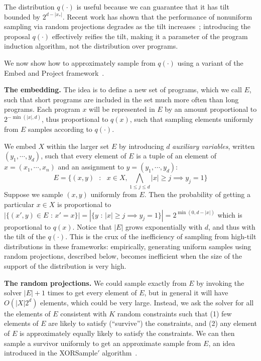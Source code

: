 \documentclass{article}
\begin{document}
The distribution $q(\cdot )$ is useful because we can guarantee that it has tilt bounded by
$2^{d - \lvert x_* \rvert }$.
Recent work has shown that the performance of nonuniform sampling via random projections degrades as the tilt increases~\cite{chakraborty2014distribution};
introducing the proposal $q(\cdot )$ effectively reifies the tilt,
making it a parameter of the program induction algorithm,
not the distribution over programs.

We now show how to approximately sample from $q(\cdot )$ using a variant of the Embed and Project framework~\cite{ermon2013embed}.

\textbf{The embedding.} The idea is to define a new set of programs, which we call $E$, such that short programs are included in the set much more often than long programs.
Each program $x$ will be represented in $E$ by an amount proportional to $2^{-\min (\lvert x \rvert ,d)}$, thus proportional to $q(x)$,
such that sampling elements uniformly from $E$  samples according to $q(\cdot )$.

We embed $X$ within the larger set $E$ by introducing $d$ \emph{auxiliary variables}, written $(y_1,\cdots, y_d)$,
such that every element of $E$ is a tuple of an element of $x = (x_1,\cdots , x_n )$ and an assignment to $y = (y_1,\cdots, y_d)$:
  \begin{equation}
    E = \{(x,y) \text{ }:\text{ } x\in X,  \bigwedge_{1\leq j \leq d} \lvert x \rvert \geq j\implies y_j=1 \}
  \end{equation}
  Suppose we sample $(x,y)$ uniformly from $E$.
  Then the probability of getting a particular $x\in X$ is proportional to
  $|\{(x',y)\in E \text{ : } x' = x\}| = |\{y\text{ : } \lvert x \rvert \geq j\implies y_j=1\}|=2^{\min (0,d-\lvert x \rvert )}$
  which is proportional to $q(x)$. Notice that $|E|$ grows exponentially with $d$, and thus with the tilt of the $q(\cdot )$. This is the crux of the inefficiency of sampling from high-tilt distributions in these frameworks:
  empirically, generating uniform samples using random projections, described below, becomes inefficient when the size of the support of the distribution is very high.

  \textbf{The random projections.} We  could sample exactly from $E$  by invoking the solver $|E|+1$ times to get every element of $E$,
  but in general it will have $O(|X|2^d)$ elements, which could be very large.
  Instead, we ask the solver for all the elements of $E$ consistent with $K$ random constraints
  such that (1) few elements of $E$ are likely to satisfy (``survive'') the constraints,
  and (2) any element of $E$ is approximately equally likely to satisfy the constraints.
  We can then sample a survivor uniformly to get an approximate sample from $E$, an idea introduced in the XORSample$'$ algorithm~\cite{gomes2006near}.
\end{document}

